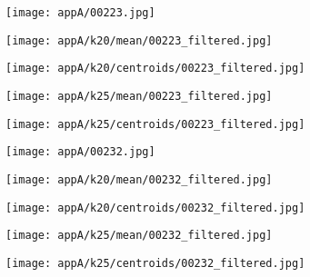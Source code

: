 \documentclass[draft,final]{vutinfth} %
\begin{document}
\begin{appendices}
\begin{figure}[h]
\centering
  \begin{subfigure}[b]{0.19\columnwidth}
    \centering
    \texttt{[image: appA/00223.jpg]}
  \end{subfigure}
  \begin{subfigure}[b]{0.19\columnwidth}
    \centering
    \texttt{[image: appA/k20/mean/00223\_filtered.jpg]}
  \end{subfigure}
  \begin{subfigure}[b]{0.19\columnwidth}
    \centering
    \texttt{[image: appA/k20/centroids/00223\_filtered.jpg]}
  \end{subfigure}
  \begin{subfigure}[b]{0.19\columnwidth}
    \centering
    \texttt{[image: appA/k25/mean/00223\_filtered.jpg]}
  \end{subfigure}
  \begin{subfigure}[b]{0.19\columnwidth}
    \centering
    \texttt{[image: appA/k25/centroids/00223\_filtered.jpg]}
  \end{subfigure}
\caption{}
 \label{appA:223}
\end{figure}  

\begin{figure}[h]
\centering
  \begin{subfigure}[b]{0.19\columnwidth}
    \centering
    \texttt{[image: appA/00232.jpg]}
  \end{subfigure}
  \begin{subfigure}[b]{0.19\columnwidth}
    \centering
    \texttt{[image: appA/k20/mean/00232\_filtered.jpg]}
  \end{subfigure}
  \begin{subfigure}[b]{0.19\columnwidth}
    \centering
    \texttt{[image: appA/k20/centroids/00232\_filtered.jpg]}
  \end{subfigure}
  \begin{subfigure}[b]{0.19\columnwidth}
    \centering
    \texttt{[image: appA/k25/mean/00232\_filtered.jpg]}
  \end{subfigure}
  \begin{subfigure}[b]{0.19\columnwidth}
    \centering
    \texttt{[image: appA/k25/centroids/00232\_filtered.jpg]}
  \end{subfigure}
\caption{}
\label{appA:232}
\end{figure}  


\end{appendices}
\end{document}
